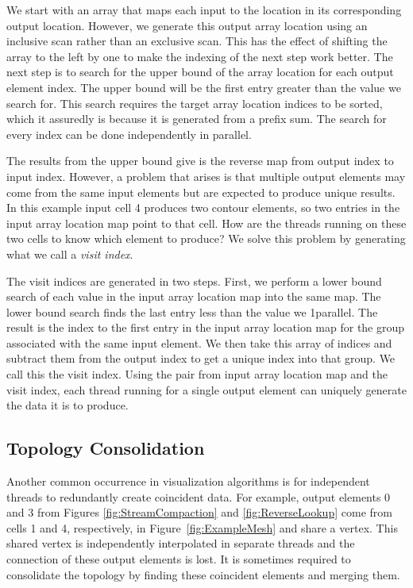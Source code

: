 \documentclass{superfri}
\newcommand*{\keyterm}[1]{\emph{#1}}
\begin{document}
We start with an array that maps each input to the location in its
corresponding output location. However, we generate this output array
location using an inclusive scan rather than an exclusive scan. This has
the effect of shifting the array to the left by one to make the indexing of
the next step work better. The next step is to search for the upper bound
of the array location for each output element index. The upper bound will
be the first entry greater than the value we search for. This search
requires the target array location indices to be sorted, which it assuredly
is because it is generated from a prefix sum. The search for every index
can be done independently in parallel.

The results from the upper bound give is the reverse map from output index
to input index. However, a problem that arises is that multiple output
elements may come from the same input elements but are expected to produce
unique results. In this example input cell 4 produces two contour
elements, so two entries in the input array location map point to that
cell. How are the threads running on these two cells to know which element
to produce? We solve this problem by generating what we call a
\keyterm{visit index}.

The visit indices are generated in two steps. First, we perform a lower
bound search of each value in the input array location map into the same
map. The lower bound search finds the last entry less than the value we
1parallel. The result is the index to the first entry in the input array
location map for the group associated with the same input element. We then
take this array of indices and subtract them from the output index to get a
unique index into that group. We call this the visit index. Using the pair
from input array location map and the visit index, each thread running for
a single output element can uniquely generate the data it is to produce.

\subsection{Topology Consolidation}

\noindent
Another common occurrence in visualization algorithms is for independent
threads to redundantly create coincident data. For example, output elements
0 and 3 from Figures \ref{fig:StreamCompaction} and \ref{fig:ReverseLookup}
come from cells 1 and 4, respectively, in Figure~\ref{fig:ExampleMesh} and
share a vertex. This shared vertex is independently interpolated in
separate threads and the connection of these output elements is lost. It is
sometimes required to consolidate the topology by finding these coincident
elements and merging them.
\end{document}
